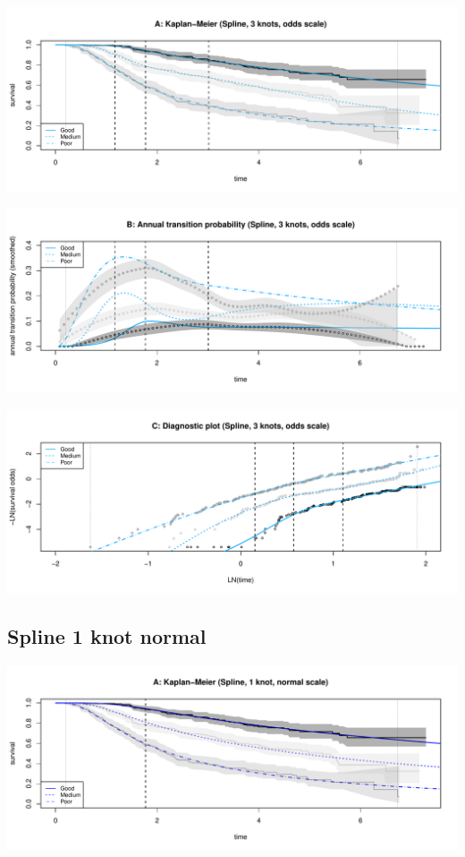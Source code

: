\documentclass[]{article}
\begin{document}
\begin{flushleft}\includegraphics[height=0.25\textheight]{Images/spline_odds3-1} \end{flushleft}

\begin{flushleft}\includegraphics[height=0.25\textheight]{Images/spline_odds3-2} \end{flushleft}

\begin{flushleft}\includegraphics[height=0.25\textheight]{Images/spline_odds3-3} \end{flushleft}

\newpage 

\subsection{Spline 1 knot normal}\label{spline-1-knot-normal}

\begin{flushleft}\includegraphics[height=0.25\textheight]{Images/spline_norm1-1} \end{flushleft}
\end{document}
